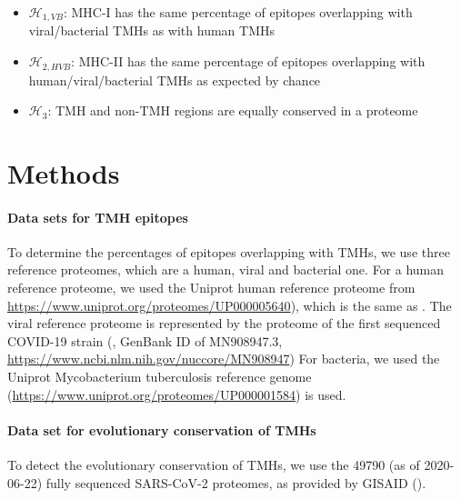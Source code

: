 
\begin{itemize}
  \item $\mathcal{H}_{1,VB}$: MHC-I has the same percentage of epitopes overlapping
    with viral/bacterial TMHs as with human TMHs
  \item $\mathcal{H}_{2,HVB}$: MHC-II has the same percentage of epitopes overlapping
    with human/viral/bacterial TMHs as expected by chance
  \item $\mathcal{H}_{3}$: TMH and non-TMH regions are equally conserved
    in a proteome
\end{itemize}

\section{Methods}

\paragraph{Data sets for TMH epitopes}

To determine the percentages of epitopes overlapping
with TMHs, we use three reference proteomes, which are
a human, viral and bacterial one.
For a human reference proteome, we used the Uniprot human reference proteome
from \url{https://www.uniprot.org/proteomes/UP000005640}), 
which is the same as \cite{bianchi2017}.
The viral reference proteome is represented by
the proteome of the first sequenced COVID-19 strain (\cite{wu2020new},
GenBank ID of MN908947.3, \url{https://www.ncbi.nlm.nih.gov/nuccore/MN908947})
For bacteria, we used the Uniprot Mycobacterium tuberculosis reference genome
(\url{https://www.uniprot.org/proteomes/UP000001584}) is used.

\paragraph{Data set for evolutionary conservation of TMHs}

To detect the evolutionary conservation of TMHs,
we use the 49790 (as of 2020-06-22) fully sequenced SARS-CoV-2 proteomes, 
as provided by GISAID (\cite{shu2017gisaid}).

